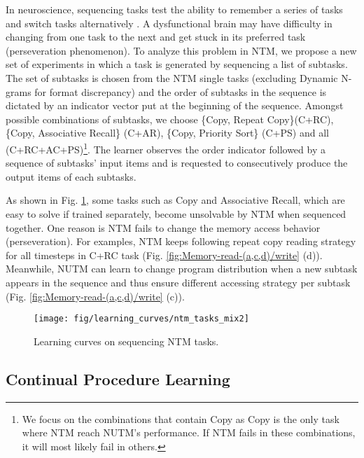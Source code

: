 \documentclass[english]{article}
\renewcommand{\cite}{\citep}
\begin{document}
In neuroscience, sequencing tasks test the ability to remember a series
of tasks and switch tasks alternatively \cite{hal2019neur}. A dysfunctional
brain may have difficulty in changing from one task to the next and
get stuck in its preferred task (perseveration phenomenon). To analyze
this problem in NTM, we propose a new set of experiments in which
a task is generated by sequencing a list of subtasks. The set of subtasks
is chosen from the NTM single tasks (excluding Dynamic N-grams for
format discrepancy) and the order of subtasks in the sequence is dictated
by an indicator vector put at the beginning of the sequence. Amongst
possible combinations of subtasks, we choose \{Copy, Repeat Copy\}(C+RC),
\{Copy, Associative Recall\} (C+AR), \{Copy, Priority Sort\} (C+PS)
and all (C+RC+AC+PS)\footnote{We focus on the combinations that contain Copy as Copy is the only
task where NTM reach NUTM's performance. If NTM fails in these combinations,
it will most likely fail in others.}. The learner observes the order indicator followed by a sequence
of subtasks' input items and is requested to consecutively produce
the output items of each subtasks. 

As shown in Fig. \ref{fig:Learning-curves-on-1}, some tasks such
as Copy and Associative Recall, which are easy to solve if trained
separately, become unsolvable by NTM when sequenced together. One
reason is NTM fails to change the memory access behavior (perseveration).
For examples, NTM keeps following repeat copy reading strategy for
all timesteps in C+RC task (Fig. \ref{fig:Memory-read-(a,c,d)/write}
(d)). Meanwhile, NUTM can learn to change program distribution when
a new subtask appears in the sequence and thus ensure different accessing
strategy per subtask (Fig. \ref{fig:Memory-read-(a,c,d)/write} (c)).

\begin{figure}
\begin{centering}
\texttt{[image: fig/learning\_curves/ntm\_tasks\_mix2]}
\par\end{centering}
\caption{Learning curves on sequencing NTM tasks.\label{fig:Learning-curves-on-1}}
\end{figure}

\subsection{Continual Procedure Learning}
\end{document}
